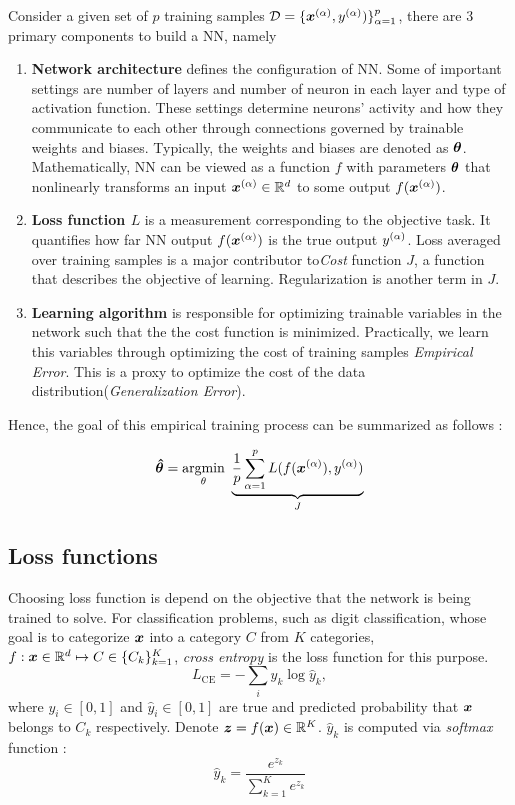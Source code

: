 Consider a given set of $p$ training samples $\mathcal{D} = \{ \xa, \ya) \}_{\alpha=1}^{p}$,  there are 3 primary components to build a NN, namely  
\begin{enumerate}
	\item \textbf{Network architecture} defines the configuration of NN. Some of important settings are number of layers and number of neuron in each layer and type of activation function. These settings determine neurons' activity and how they communicate to each other through connections governed by trainable weights and biases. Typically, the weights and biases are denoted as $\patvector{\theta}$. Mathematically, NN can be viewed as a function $f$ with parameters $\patvector{\theta}$ that nonlinearly transforms an input $\xa\in \mathbb{R}^d $ to some output $f(\xa)$.
	\item \textbf{Loss function $L$}  is a measurement corresponding to the objective task. It quantifies how far NN output $f(\xa)$ is the true output $y^{(\alpha)}$. Loss averaged over training samples is a major contributor to\textit{Cost} function $J$, a function that describes the objective of learning. Regularization is another term in $J$. %
	\item \textbf{Learning algorithm} is responsible for optimizing trainable variables in the network such that the the cost function is minimized. Practically, we learn this variables through optimizing the cost of training samples \textit{Empirical Error}. This is a proxy to optimize the cost of the data distribution(\textit{Generalization Error}). 
\end{enumerate}

Hence, the goal of this empirical training process can be summarized as follows : 

\begin{align} \label{eq:nn_opt}
	\patvector{\hat{\theta}} = \patarg{min}{\theta} \underbrace{\frac{1}{p}  \sum_{\alpha=1}^p L( f(\xa), \ya) }_{J}
\end{align}

\subsection{Loss functions}
Choosing loss function is depend on the objective that the network is being trained to solve. For classification problems, such as digit classification, whose goal is to categorize $\boldsymbol{x}$ into a category $C$ from $K$ categories, $f : \boldsymbol{x} \in \mathbb{R}^d  \mapsto C \in \{ C_k \}_{k=1}^K$, \textit{cross entropy} is the loss function for this purpose.
$$
L_{\text{CE}} = - \sum_{i} y_k \log \hat{y}_k,
$$
where $y_i \in [0, 1]$ and $\hat{y}_i \in [0, 1]$ are true and predicted probability that $\boldsymbol{x}$ belongs to $C_k$ respectively. Denote $\patvector{z} = f(\x) \in \mathbb{R}^{K}$. $\hat{y}_k$ is computed via \textit{softmax} function :
$$
\hat{y}_k = \frac{e^{z_k}}{ \sum_{k=1}^K{e^{z_k}} }
$$ 

